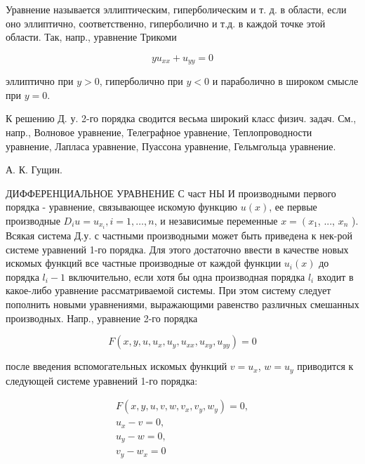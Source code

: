 \documentclass[10pt]{article}
\begin{document}
Уравнение называется эллиптическим, гиперболическим и т. д. в области, если оно эллиптично, соответственно, гиперболично и т.д. в каждой точке этой области. Так, напр., уравнение Трикоми



\[

y u_{x x}+u_{y y}=0

\]



эллиптично при $y>0$, гиперболично при $y<0$ и параболично в широком смысле при $y=0$.



К решению Д. у. 2-го порядка сводится весьма широкий класс физич. задач. См., напр., Волновое уравнение, Телеграфное уравнение, Теплопроводности уравнение, Лапласа уравнение, Пуассона уравнение, Гельмгольца уравнение.



А. К. Гущин.



ДИФФЕРЕНЦИАЛЬНОЕ УРАВНЕНИЕ С част НЫ И производными первого порядка - уравнение, связывающее искомую функцию $u(x)$, ее первые производные $D_{i} u=u_{x_{i}}, i=1, \ldots, n$, и независимые переменные $x=\left(x_{1}\right.$, ..., $x_{n}$ ). Всякая система Д.у. с частными производными может быть приведена к нек-рой системе уравнений 1-го порядка. Для этого достаточно ввести в качестве новых искомых функций все частные производные от каждой функции $u_{i}(x)$ до порядка $l_{i}-1$ включительно, если хотя бы одна производная порядка $l_{i}$ входит в какое-либо уравнение рассматриваемой системы. При этом систему следует пополнить новыми уравнениями, выражающими равенство различных смешанных производных. Напр., уравнение 2-го порядка



\[

F\left(x, y, u, u_{x}, u_{y}, u_{x x}, u_{x y}, u_{y y}\right)=0

\]



после введения вспомогательных искомых функций $v=u_{x}$, $w=u_{y}$ приводится к следующей системе уравнений 1-го порядка:



\[

\begin{gathered}

F\left(x, y, u, v, w, v_{x}, v_{y}, w_{y}\right)=0, \\

u_{x}-v=0, \\

u_{y}-w=0, \\

v_{y}-w_{x}=0

\end{gathered}

\]
\end{document}
